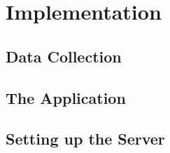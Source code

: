 \chapter{Implementation}
\label{chap:Implementation}


\section{Data Collection}
\label{sec:Data Collection}


\section{The Application}
\label{sec:The Application}


\section{Setting up the Server}
\label{sec:Setting up the Server}
